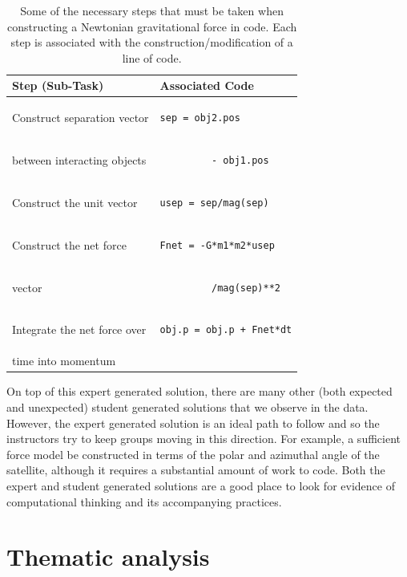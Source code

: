 \documentclass{msuphddissertation}
\begin{document}
\begin{doublespace}
\begin{table}[hb]\centering
\begin{tabular}{ll}
\textbf{Step (Sub-Task)} & \textbf{Associated Code} \\\hline
Construct separation vector & \begin{lstlisting}
sep = obj2.pos
\end{lstlisting}\\
between interacting objects & \begin{lstlisting}
         - obj1.pos
\end{lstlisting}\\\hline
Construct the unit vector & \begin{lstlisting}
usep = sep/mag(sep)
\end{lstlisting}\\\hline
Construct the net force & \begin{lstlisting}
Fnet = -G*m1*m2*usep
\end{lstlisting}\\
vector & \begin{lstlisting}
         /mag(sep)**2
\end{lstlisting}\\\hline
Integrate the net force over & \begin{lstlisting}
obj.p = obj.p + Fnet*dt
\end{lstlisting}\\
time into momentum & \\
\end{tabular}\caption{Some of the necessary steps that must be taken when constructing a Newtonian gravitational force in code.  Each step is associated with the construction/modification of a line of code.\label{CH3:TaskAnalysis}}
\end{table}
 
On top of this expert generated solution, there are many other (both expected and unexpected) student generated solutions that we observe in the data.  However, the expert generated solution is an ideal path to follow and so the instructors try to keep groups moving in this direction.  For example, a sufficient force model be constructed in terms of the polar and azimuthal angle of the satellite, although it requires a substantial amount of work to code.  Both the expert and student generated solutions are a good place to look for evidence of computational thinking and its accompanying practices.

\section{Thematic analysis}


\end{doublespace}
\end{document}
